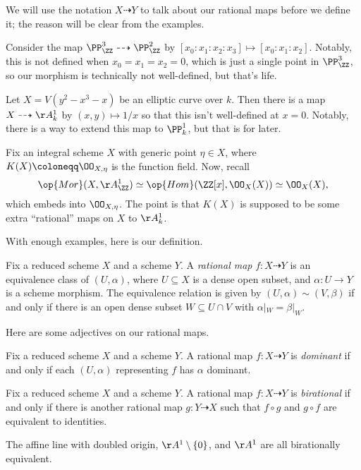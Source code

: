 \documentclass[../notes.tex]{subfiles}
\begin{document}
We will use the notation $X\dashrightarrow Y$ to talk about our rational maps before we define it; the reason will be clear from the examples.
\begin{example}
	Consider the map $\PP^3_\ZZ\dashrightarrow\PP^2_\ZZ$ by $[x_0:x_1:x_2:x_3]\mapsto[x_0:x_1:x_2]$. Notably, this is not defined when $x_0=x_1=x_2=0$, which is just a single point in $\PP^3_\ZZ$, so our morphism is technically not well-defined, but that's life.
\end{example}
\begin{example}
	Let $X=V(y^2-x^3-x)$ be an elliptic curve over $k$. Then there is a map $X\dashrightarrow\AA^1_k$ by $(x,y)\mapsto 1/x$ so that this isn't well-defined at $x=0$. Notably, there is a way to extend this map to $\PP^1_k$, but that is for later.
\end{example}
\begin{example}
	Fix an integral scheme $X$ with generic point $\eta\in X$, where $K(X)\coloneqq\OO_{X,\eta}$ is the function field. Now, recall
	\[\op{Mor}(X,\AA^1_\ZZ)\simeq\op{Hom}(\ZZ[x],\OO_X(X))\simeq\OO_X(X),\]
	which embeds into $\OO_{X,\eta}$. The point is that $K(X)$ is supposed to be some extra ``rational'' maps on $X$ to $\AA^1_k$.
\end{example}
With enough examples, here is our definition.
\begin{definition}[Rational]
	Fix a reduced scheme $X$ and a scheme $Y$. A \textit{rational map} $f\colon X\dashrightarrow Y$ is an equivalence class of $(U,\alpha)$, where $U\subseteq X$ is a dense open subset, and $\alpha\colon U\to Y$ is a scheme morphism. The equivalence relation is given by $(U,\alpha)\sim(V,\beta)$ if and only if there is an open dense subset $W\subseteq U\cap V$ with $\alpha|_W=\beta|_W$.
\end{definition}
Here are some adjectives on our rational maps.
\begin{defi}[Dominant]
	Fix a reduced scheme $X$ and a scheme $Y$. A rational map $f\colon X\dashrightarrow Y$ is \textit{dominant} if and only if each $(U,\alpha)$ representing $f$ has $\alpha$ dominant.
\end{defi}
\begin{definition}[Birational]
	Fix a reduced scheme $X$ and a scheme $Y$. A rational map $f\colon X\dashrightarrow Y$ is \textit{birational} if and only if there is another rational map $g\colon Y\dashrightarrow X$ such that $f\circ g$ and $g\circ f$ are equivalent to identities.
\end{definition}
\begin{ex}
	The affine line with doubled origin, $\AA^1\setminus\{0\}$, and $\AA^1$ are all birationally equivalent.
\end{ex}
\end{document}
